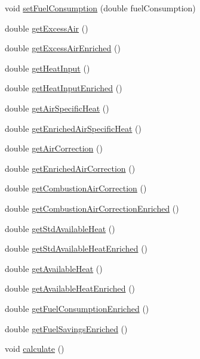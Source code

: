 \begin{DoxyCompactItemize}
\item 
void \hyperlink{class_o2_enrichment_ae2b7ed0ecf7b71b2a68f488c7760efaf}{set\+Fuel\+Consumption} (double fuel\+Consumption)
\item 
double \hyperlink{class_o2_enrichment_aba7923d4967cc1258ad6d078822f699a}{get\+Excess\+Air} ()
\item 
double \hyperlink{class_o2_enrichment_ad6e95234bd10eafb98a741e1bd75be58}{get\+Excess\+Air\+Enriched} ()
\item 
double \hyperlink{class_o2_enrichment_a3a9fb23728ab5831e47cb5aafb438439}{get\+Heat\+Input} ()
\item 
double \hyperlink{class_o2_enrichment_ac1d74fe5a8791b9a8bc596bcb19b8b1e}{get\+Heat\+Input\+Enriched} ()
\item 
double \hyperlink{class_o2_enrichment_a435552fca78d0648dddaf406e250e9b6}{get\+Air\+Specific\+Heat} ()
\item 
double \hyperlink{class_o2_enrichment_ac9fc3524b7243fbaac29884c1e6c5748}{get\+Enriched\+Air\+Specific\+Heat} ()
\item 
double \hyperlink{class_o2_enrichment_a95f854d807f2b33ca32c68707e627283}{get\+Air\+Correction} ()
\item 
double \hyperlink{class_o2_enrichment_a7e1eeaca64c46969c0652a46b67fad76}{get\+Enriched\+Air\+Correction} ()
\item 
double \hyperlink{class_o2_enrichment_a7ecca6a53529843246555ae33379d464}{get\+Combustion\+Air\+Correction} ()
\item 
double \hyperlink{class_o2_enrichment_aa8bbec67d760c83da77ce5b4ee01e41c}{get\+Combustion\+Air\+Correction\+Enriched} ()
\item 
double \hyperlink{class_o2_enrichment_a6eab50d08baaca010d208139cb99d239}{get\+Std\+Available\+Heat} ()
\item 
double \hyperlink{class_o2_enrichment_a24fd19f2aca20c7ba83061b832323ad6}{get\+Std\+Available\+Heat\+Enriched} ()
\item 
double \hyperlink{class_o2_enrichment_ac34e93c7e1444ab81a621428f0eee4d3}{get\+Available\+Heat} ()
\item 
double \hyperlink{class_o2_enrichment_afc7f9ea349f338ead76255218769a3e3}{get\+Available\+Heat\+Enriched} ()
\item 
double \hyperlink{class_o2_enrichment_aaf0dae071145b439e995d90f838878a7}{get\+Fuel\+Consumption\+Enriched} ()
\item 
double \hyperlink{class_o2_enrichment_a2aa9f8d3a02935931e705f82ae57c72f}{get\+Fuel\+Savings\+Enriched} ()
\item 
void \hyperlink{class_o2_enrichment_a91d7e18a336466cf9fbc0cae42dde282}{calculate} ()
\end{DoxyCompactItemize}


